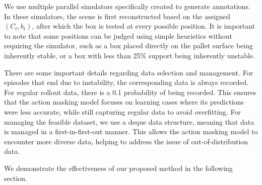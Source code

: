 We use multiple parallel simulators specifically created to generate annotations. In these simulators, the scene is first reconstructed based on the assigned $(C_t, b_t)$, after which the box is tested at every possible position. It is important to note that some positions can be judged using simple heuristics without requiring the simulator, such as a box placed directly on the pallet surface being inherently stable, or a box with less than 25\% support being inherently unstable.

There are some important details regarding data selection and management. For episodes that end due to instability, the corresponding data is always recorded. For regular rollout data, there is a 0.1 probability of being recorded. This ensures that the action masking model focuses on learning cases where its predictions were less accurate, while still capturing regular data to avoid overfitting. For managing the feasible dataset, we use a deque data structure, meaning that data is managed in a first-in-first-out manner. This allows the action masking model to encounter more diverse data, helping to address the issue of out-of-distribution data.

We demonstrate the effectiveness of our proposed method in the following section. 